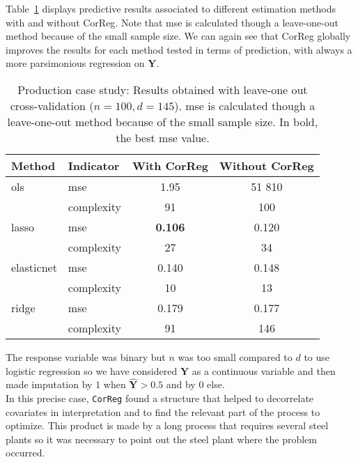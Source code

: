 \documentclass[12pt,a4paper]{report}
\begin{document}

Table~\ref{Res_prod} displays predictive results associated to different estimation methods with and without {\sc CorReg}. Note that {\sc mse} is calculated though a leave-one-out method because of the small sample size. We can again see that {\sc CorReg} globally improves the results for each method tested in terms of prediction, with always a more parsimonious regression on $\boldsymbol{Y}$.
		

\begin{table}[h!]
\centering
\begin{tabular}{llcc}
	\hline 
	Method& Indicator& With {\sc CorReg} & Without {\sc CorReg} \\ 
	\hline\hline
	{\sc ols} &  {\sc mse}& 1.95& 51 810\\
		& complexity & 91& 100 \\
	\hline 
		{\sc lasso} & {\sc mse} & {\bf 0.106} & 0.120\\
		& complexity & 27&34\\
	\hline 
		elasticnet & {\sc mse} &0.140 &0.148\\
		& complexity &10 &13\\
	\hline 
		ridge & {\sc mse} & 0.179 & 0.177\\
		& complexity &91 &146\\
	\hline 
\end{tabular} 
\caption{Production case study: Results obtained with leave-one out cross-validation ($n=100, d=145$). {\sc mse} is calculated though a leave-one-out method because of the small sample size. In bold, the best {\sc mse} value.}	\label{Res_prod}
\end{table}
The response variable was binary but $n$ was too small compared to $d$ to use logistic regression so we have considered $\boldsymbol{Y}$ as a continuous variable and then made imputation by $1$ when $\hat{\boldsymbol{Y}}>0.5$ and by $0$ else.\\

In this precise case, {\tt CorReg} found a structure that helped to decorrelate covariates in interpretation and to find the relevant part of the process to optimize. This product is made by a long process that requires several steel plants so it was necessary to point out the steel plant where the problem occurred.
\end{document}

